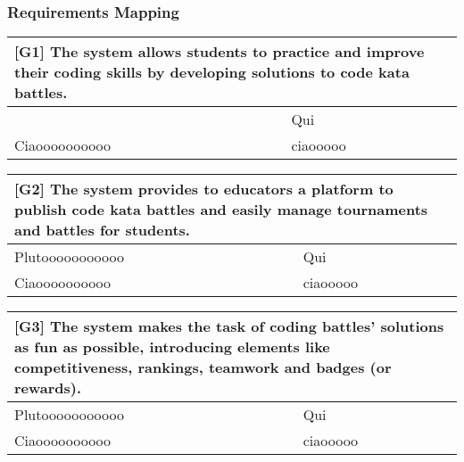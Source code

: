 \subsubsection{Requirements Mapping}

\hspace{0.5cm}

\begin{tabular}{|p{8cm}|p{8cm}|}
\hline
\multicolumn{2}{|p{16cm}|}{[G1] The system allows students to practice and improve their coding skills by developing solutions to code kata battles.}\\
\hline
 & Qui\\
Ciaoooooooooo & ciaooooo \\
\hline
\end{tabular}

\vspace{1cm}

\begin{tabular}{|p{8cm}|p{8cm}|}
\hline
\multicolumn{2}{|p{16cm}|}{[G2] The system provides to educators a platform to publish code kata battles and easily manage tournaments and battles for students.}\\
\hline
Plutooooooooooo & Qui\\
Ciaoooooooooo & ciaooooo \\
\hline
\end{tabular}

\vspace{1cm}

\begin{tabular}{|p{8cm}|p{8cm}|}
\hline
\multicolumn{2}{|p{16cm}|}{[G3] The system makes the task of coding battles' solutions as fun as possible, introducing elements like competitiveness, rankings, teamwork and badges (or rewards).}\\
\hline
Plutooooooooooo & Qui\\
Ciaoooooooooo & ciaooooo \\
\hline
\end{tabular}